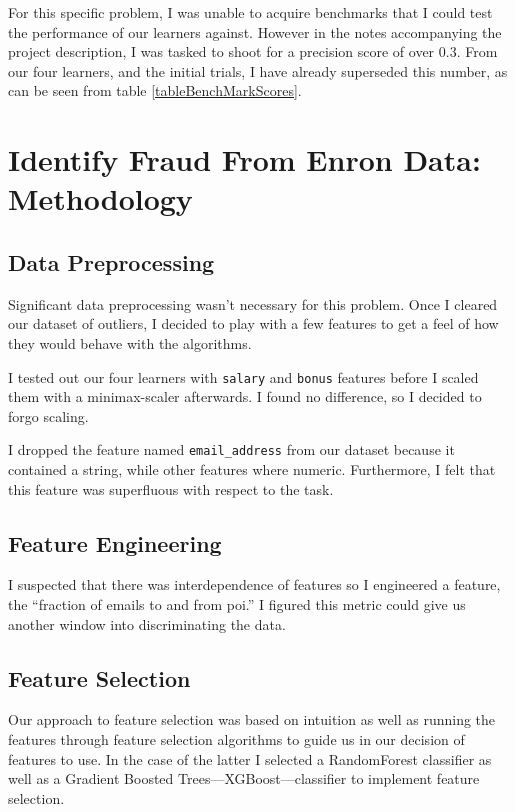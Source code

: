 \documentclass[titlepage,numbers=noenddot,headinclude,%
               footinclude=true,abstractoff,BCOR=5mm,%
               paper=a4,fontsize=11pt,ngerman,american]{scrreprt}
\numberwithin{theorem}{chapter}
\numberwithin{definition}{chapter}
\numberwithin{algorithm}{chapter}
\numberwithin{figure}{chapter}
\numberwithin{table}{chapter}
\numberwithin{equation}{chapter}
\begin{document}
For this specific problem, I was unable to acquire benchmarks that I could test the performance of our learners against. However in the notes accompanying the project description, I was tasked to shoot for a precision score of over 0.3. From our four learners, and the initial trials, I have already superseded this number, as can be seen from table \ref{tableBenchMarkScores}.


\chapter*{Identify Fraud From Enron Data: Methodology}

\section*{Data Preprocessing}
Significant data preprocessing wasn't necessary for this problem. Once I cleared our dataset of outliers, I decided to play with a few features to get a feel of how they would behave with the algorithms.

I tested out our four learners with \texttt{salary} and \texttt{bonus} features before I scaled them with a minimax-scaler afterwards. I found no difference, so I decided to forgo scaling.

I dropped the feature named \texttt{email\_address} from our dataset because it contained a string, while other features where numeric. Furthermore, I felt that this feature was superfluous with respect to the task.

\section*{Feature Engineering}
I suspected that there was interdependence of features so I engineered a feature, the ``fraction of emails to and from poi.'' I figured this metric could give us another window into discriminating the data.

\section*{Feature Selection}
Our approach to feature selection was based on intuition as well as running the features through feature selection algorithms to guide us in our decision of features to use. In the case of the latter I selected a RandomForest classifier as well as a Gradient Boosted Trees---XGBoost---classifier to implement feature selection.
\end{document}
